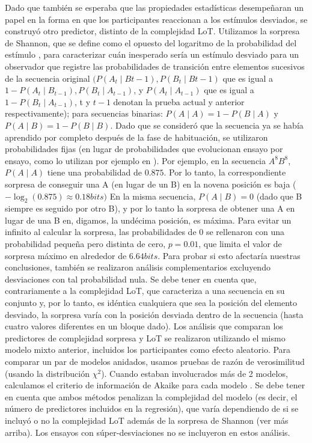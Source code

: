 Dado que también se esperaba que las propiedades estadísticas desempeñaran un papel en la forma en que los participantes reaccionan a los estímulos desviados, se construyó otro predictor, distinto de la complejidad LoT. Utilizamos la sorpresa de Shannon, que se define como el opuesto del logaritmo de la probabilidad del estímulo \cite{f21,f80,f82,f83,f84}, para caracterizar cuán inesperado sería un estímulo desviado para un observador que registre las probabilidades de transición entre elementos sucesivos de la secuencia original $(P(A_t \mid B{t-1 }), P(B_t \mid B{t-1})$ que es igual a $1 - P(A_t \mid B_{t-1}), P(B_t \mid A_{t-1})$, y $P(A_t \mid A_{t-1})$ que es igual a $1-P(B_t \mid A_{t-1})$, t y $t-1$ denotan la prueba actual y anterior respectivamente); para secuencias binarias: $P(A \mid A) = 1 - P (B \mid A)$ y $P(A \mid B) = 1 - P (B \mid B)$. Dado que se consideró que la secuencia ya se había aprendido por completo después de la fase de habituación, se utilizaron probabilidades fijas (en lugar de probabilidades que evolucionan ensayo por ensayo, como lo utilizan por ejemplo en \cite{f19,f20,f80}). Por ejemplo, en la secuencia $A^8B^8$, $P(A \mid A)$ tiene una probabilidad de $0.875$. Por lo tanto, la correspondiente sorpresa de conseguir una A (en lugar de un B) en la novena posición es baja ($-\log_2(0.875) \approx 0.18 bits)$ En la misma secuencia, $P(A \mid B) = 0$ (dado que B siempre es seguido por otro B), y por lo tanto la sorpresa de obtener una A en lugar de una B en, digamos, la undécima posición, es máxima. Para evitar un infinito al calcular la sorpresa, las probabilidades de 0 se rellenaron con una probabilidad pequeña pero distinta de cero, $p = 0.01$, que limita el valor de sorpresa máximo en alrededor de $6.64 bits$. Para probar si esto afectaría nuestras conclusiones, también se realizaron análisis complementarios excluyendo desviaciones con tal probabilidad nula. Se debe tener en cuenta que, contrariamente a la complejidad LoT, que caracteriza a una secuencia en su conjunto y, por lo tanto, es idéntica cualquiera que sea la posición del elemento desviado, la sorpresa varía con la posición desviada dentro de la secuencia (hasta cuatro valores diferentes en un bloque dado). Los análisis que comparan los predictores de complejidad sorpresa y LoT se realizaron utilizando el mismo modelo mixto anterior, incluidos los participantes como efecto aleatorio. Para comparar un par de modelos anidados, usamos pruebas de razón de verosimilitud (usando la distribución $\chi^2$). Cuando estaban involucrados más de 2 modelos, calculamos el criterio de información de Akaike para cada modelo \cite{f140}. Se debe tener en cuenta que ambos métodos penalizan la complejidad del modelo (es decir, el número de predictores incluidos en la regresión), que varía dependiendo de si se incluyó o no la complejidad LoT además de la sorpresa de Shannon (ver más arriba). Los ensayos con súper-desviaciones no se incluyeron en estos análisis.

